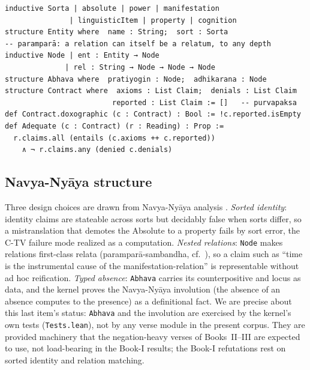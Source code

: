 \documentclass[11pt]{article}
\begin{document}
\begin{lstlisting}[language=lean, caption={Core of the adequacy kernel (abridged).}]
inductive Sorta | absolute | power | manifestation
               | linguisticItem | property | cognition
structure Entity where  name : String;  sort : Sorta
-- paramparā: a relation can itself be a relatum, to any depth
inductive Node | ent : Entity → Node
              | rel : String → Node → Node → Node
structure Abhava where  pratiyogin : Node;  adhikarana : Node
structure Contract where  axioms : List Claim;  denials : List Claim
                         reported : List Claim := []   -- purvapaksa
def Contract.doxographic (c : Contract) : Bool := !c.reported.isEmpty
def Adequate (c : Contract) (r : Reading) : Prop :=
  r.claims.all (entails (c.axioms ++ c.reported))
    ∧ ¬ r.claims.any (denied c.denials)
\end{lstlisting}

\subsection{Navya-Ny\={a}ya structure}
Three design choices are drawn from Navya-Ny\={a}ya analysis
\citep{ingalls1951materials, matilal1968navya}. \emph{Sorted identity}:
identity claims are stateable across sorts but decidably false when sorts
differ, so a mistranslation that demotes the Absolute to a property fails by
sort error, the C-TV failure mode realized as a computation. \emph{Nested
relations}: \texttt{Node} makes relations first-class relata
(parampar\={a}-sambandha, cf.~\citealp{houben1995sambandha}), so a claim
such as ``time is the instrumental cause of the manifestation-relation'' is
representable without ad hoc reification. \emph{Typed absence}:
\texttt{Abhava} carries its counterpositive and locus as data, and the
kernel proves the Navya-Ny\={a}ya involution (the absence of an absence
computes to the presence) as a definitional fact. We are precise about this
last item's status: \texttt{Abhava} and the involution are exercised by the
kernel's own tests (\texttt{Tests.lean}), not by any verse module in the
present corpus. They are provided machinery that the negation-heavy verses of
Books~II--III are expected to use, not load-bearing in the Book-I results;
the Book-I refutations rest on sorted identity and relation matching.
\end{document}
